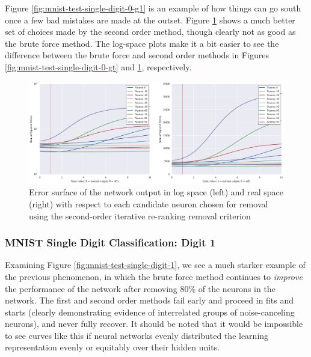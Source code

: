 Figure \ref{fig:mnist-test-single-digit-0-g1} is an example of how things can go south once a few bad mistakes are made at the outset. Figure \ref{fig:mnist-test-single-digit-0-g2} shows a much better set of choices made by the second order method, though clearly not as good as the brute force method. The log-space plots make it a bit easier to see the difference between the brute force and second order methods in Figures \ref{fig:mnist-test-single-digit-0-gt} and \ref{fig:mnist-test-single-digit-0-g2}, respectively. 

\begin{figure}[!ht]
\centering
\includegraphics[width=\linewidth]{mnist-test-single-digit-0-g2.pdf}
\caption{Error surface of the network output in log space (left) and real space (right) with respect to each candidate neuron chosen for removal using the second-order iterative re-ranking removal criterion}
\label{fig:mnist-test-single-digit-0-g2}
\end{figure}

\subsubsection{MNIST Single Digit Classification: Digit 1}

Examining Figure \ref{fig:mnist-test-single-digit-1}, we see a much starker example of the previous phenomenon, in which the brute force method continues to \textit{improve} the performance of the network after removing 80\% of the neurons in the network. The first and second order methods fail early and proceed in fits and starts (clearly demonstrating evidence of interrelated groups of noise-canceling neurons), and never fully recover. It should be noted that it would be impossible to see curves like this if neural networks evenly distributed the learning representation evenly or equitably over their hidden units. 

